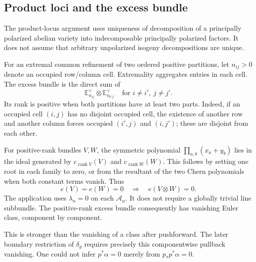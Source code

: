 \documentclass[10pt]{article}
\begin{document}
\subsection*{Product loci and the excess bundle}
The product-locus argument uses uniqueness of decomposition of a principally polarized abelian variety into indecomposable principally polarized factors. It does not assume that arbitrary unpolarized isogeny decompositions are unique.\par
For an extremal common refinement of two ordered positive partitions, let \(n_{ij}>0\) denote an occupied row/column cell. Extremality aggregates entries in each cell. The excess bundle is the direct sum of \[\mathbb E_{n_{ij}}^\vee\otimes\mathbb E_{n_{i'j'}}^\vee
       \quad\text{for } i\ne i',\ j\ne j'.\] Its rank is positive when both partitions have at least two parts. Indeed, if an occupied cell \((i,j)\) has no disjoint occupied cell, the existence of another row and another column forces occupied \((i',j)\) and \((i,j')\); these are disjoint from each other.\par
For positive-rank bundles \(V,W\), the symmetric polynomial \(\prod_{a,b}(x_a+y_b)\) lies in the ideal generated by \(c_{\operatorname{rank}V}(V)\) and \(c_{\operatorname{rank}W}(W)\). This follows by setting one root in each family to zero, or from the resultant of the two Chern polynomials when both constant terms vanish. Thus \[e(V)=e(W)=0\quad\Longrightarrow\quad e(V\otimes W)=0.\] The application uses \(\lambda_n=0\) on each \(\mathcal A_n\). It does not require a globally trivial line subbundle. The positive-rank excess bundle consequently has vanishing Euler class, component by component.\par
This is stronger than the vanishing of a class after pushforward. The later boundary restriction of \(\delta_g\) requires precisely this componentwise pullback vanishing. One could not infer \(p^*\alpha=0\) merely from \(p_*p^*\alpha=0\).\par
\end{document}
